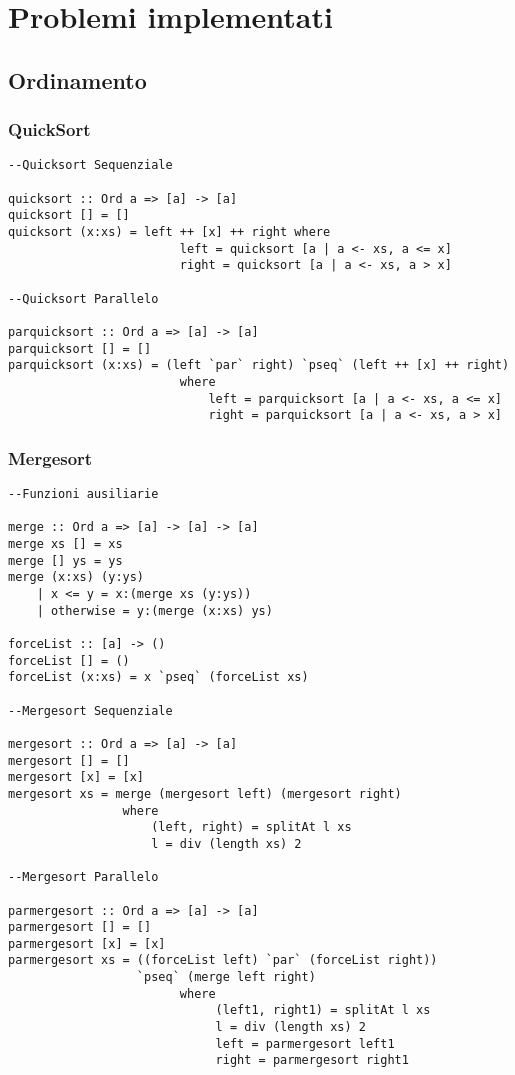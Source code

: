 \chapter{Problemi implementati}
\section{Ordinamento}
\subsection{QuickSort}
\begin{verbatim}
--Quicksort Sequenziale

quicksort :: Ord a => [a] -> [a]
quicksort [] = []
quicksort (x:xs) = left ++ [x] ++ right where
						left = quicksort [a | a <- xs, a <= x]
						right = quicksort [a | a <- xs, a > x]

--Quicksort Parallelo

parquicksort :: Ord a => [a] -> [a]
parquicksort [] = []
parquicksort (x:xs) = (left `par` right) `pseq` (left ++ [x] ++ right)
						where
							left = parquicksort [a | a <- xs, a <= x]
							right = parquicksort [a | a <- xs, a > x]
\end{verbatim}
\newpage
\subsection{Mergesort}
\begin{verbatim}
--Funzioni ausiliarie

merge :: Ord a => [a] -> [a] -> [a]
merge xs [] = xs
merge [] ys = ys
merge (x:xs) (y:ys)
	| x <= y = x:(merge xs (y:ys))
	| otherwise = y:(merge (x:xs) ys)
	
forceList :: [a] -> ()
forceList [] = ()
forceList (x:xs) = x `pseq` (forceList xs)

--Mergesort Sequenziale

mergesort :: Ord a => [a] -> [a]
mergesort [] = []
mergesort [x] = [x]
mergesort xs = merge (mergesort left) (mergesort right)
				where
					(left, right) = splitAt l xs
					l = div (length xs) 2

--Mergesort Parallelo

parmergesort :: Ord a => [a] -> [a]
parmergesort [] = []
parmergesort [x] = [x]
parmergesort xs = ((forceList left) `par` (forceList right))
                  `pseq` (merge left right)
				        where
                             (left1, right1) = splitAt l xs
                             l = div (length xs) 2
                             left = parmergesort left1
                             right = parmergesort right1
\end{verbatim}
\newpage
